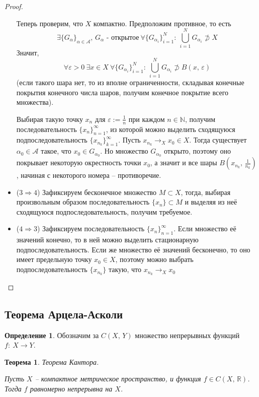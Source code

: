 \documentclass[a4paper,12pt]{article}
\theoremstyle{plain}
\newtheorem{theorem}{Теорема}[section]
\theoremstyle{definition}
\newtheorem{definition}{Определение}[section]
\theoremstyle{remark}
\begin{document}
\begin{proof}
\begin{itemize}
		      Теперь проверим, что $X$ компактно. Предположим противное, то есть
		      \[
			      \exists \{G_\alpha\}_{\alpha \in \mathcal{A}},\, G_\alpha \text{ - открытое} \: \forall \{G_{\alpha_i}\}_{i = 1}^N :\: \bigcup_{i = 1}^N  G_{\alpha_i} \not\supset X
		      \]
		      Значит,
		      \[
			      \forall \varepsilon > 0 \: \exists x \in X  \: \forall \{G_{\alpha_i}\}_{i = 1}^N :\: \bigcup_{i = 1}^N  G_{\alpha_i} \not\supset B (x,\, \varepsilon)
		      \]
		      (если такого шара нет, то из вполне ограниченности, складывая конечные покрытия конечного числа шаров, получим конечное покрытие всего множества).

		      Выбирая такую точку $x_n$ для $\varepsilon := \frac{1}{n}$ при каждом $n \in \mathbb{N}$, получим последовательность $\{x_n\}_{n = 1}^\infty$, из которой можно выделить сходящуюся подпоследовательность $\{x_{n_k}\}_{k = 1}^\infty$. Пусть $x_{n_k} \to_X x_0 \in X$.
		      Тогда существует $\alpha_0 \in \mathcal{A}$ такое, что $x_0 \in G_{\alpha_0}$. Но множество $G_{\alpha_0}$ открыто, поэтому оно покрывает некоторую окрестность точки $x_0$, а значит и все шары $B(x_{n_k},\, \frac{1}{n_k})$, начиная с некоторого номера -- противоречие.
		\item ($3 \Rightarrow 4$) Зафиксируем бесконечное множество $M \subset X$, тогда, выбирая произвольным образом последовательность $\{x_n\} \subset M$ и выделяя из неё сходящуюся подпоследовательность, получим требуемое.
		\item ($4 \Rightarrow 3$) Зафиксируем последовательность $\{x_n\}_{n = 1}^\infty$. Если множество её значений конечно, то в ней можно выделить стационарную подпоследовательность. Если же множество её значений бесконечно, то оно имеет предельную точку $x_0 \in X$, поэтому можно выбрать подпоследовательность $\{x_{n_k}\}$ такую, что $x_{n_k} \to_X x_0$
	\end{itemize}
\end{proof}

\subsection{Теорема Арцела-Асколи}
\begin{definition}
	Обозначим за $C(X,\, Y)$ множество непрерывных функций $f:\: X \to Y$.
\end{definition}

\begin{theorem}
	Теорема Кантора.

	Пусть $X$ -- компактное метрическое пространство, и функция $f \in C(X,\, \mathbb{R})$. Тогда $f$ равномерно непрерывна на $X$.
\end{theorem}
\end{document}
